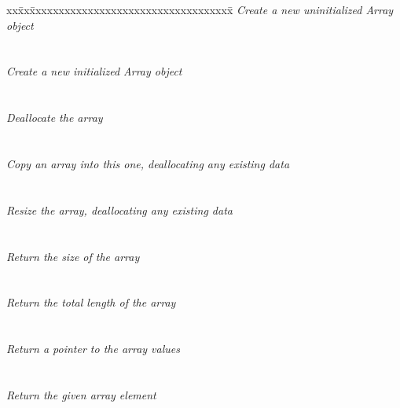 \begin{tabbing}
xx\=xx\=xxxxxxxxxxxxxxxxxxxxxxxxxxxxxxxxxxx\= \kill
\> \todo \> \textit{Create a new uninitialized Array object} \\
\>       \>  \\ \\
\> \todo \> \textit{Create a new initialized Array object} \\
\>       \>  \\ \\
\> \todo \> \textit{Deallocate the array} \\
\>       \>   \\ \\
\> \todo \> \textit{Copy an array into this one, deallocating any existing data} \\
\>       \>   \\ \\
\> \todo \> \textit{Resize the array, deallocating any existing data} \\
\>       \>    \\ \\
\> \todo \> \textit{Return the size of the array} \\
\>       \>   \\ \\
\> \todo \> \textit{Return the total length of the array} \\
\>       \>   \\ \\
\> \todo \> \textit{Return a pointer to the array values} \\
\>       \>   \\ \\
\> \todo \> \textit{Return the given array element} \\
\>       \> 
\end{tabbing}

